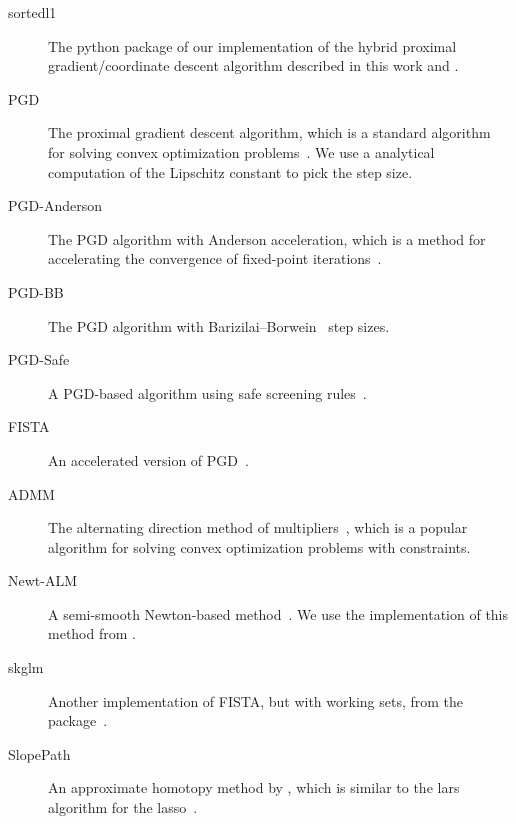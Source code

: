 \documentclass[article]{jss}
\begin{document}
\begin{description}
  \item[sortedl1] The python package of our implementation of the hybrid
        proximal gradient/coordinate descent algorithm described in this work and
        \citet{larsson2023}.
  \item[PGD] The proximal gradient descent algorithm, which is a standard
        algorithm for solving convex optimization problems~\citep{wright2009}. We use a
        analytical computation of the Lipschitz constant to pick the step size.
  \item[PGD-Anderson] The PGD algorithm with Anderson acceleration, which is a
        method for accelerating the convergence of fixed-point
        iterations~\citep{anderson1965,zhang2020}.
  \item[PGD-BB] The PGD algorithm with Barizilai--Borwein~\citep{barzilai1988} step sizes.
  \item[PGD-Safe] A PGD-based algorithm using safe screening rules~\citep{elvira2023}.
  \item[FISTA] An accelerated version of PGD~\citep{beck2009}.
  \item[ADMM] The alternating direction method of
        multipliers~\citep{glowinski1975,boyd2010}, which is a popular algorithm
        for solving convex optimization problems with constraints.
  \item[Newt-ALM] A semi-smooth Newton-based method~\citep{luo2019}. We use the
        implementation of this method from \citet{larsson2023}.
  \item[skglm] Another implementation of FISTA, but with working sets, from the
         package~\citep{bertrand2022}.
  \item[SlopePath] An approximate homotopy method by \citet{dupuis2024},
        which is similar to the lars algorithm for the lasso~\citep{efron2004}.
\end{description}



\newpage
\end{document}
